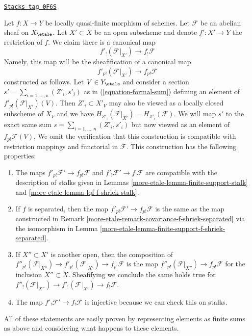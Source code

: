 \begin{remark}

\label{more-etale-remark-covariance-lqf-f-shriek}
\href{https://stacks.math.columbia.edu/tag/0F6S}{\texttt{Stacks tag 0F6S}}

Let $f : X \to Y$ be locally quasi-finite morphism of schemes. Let
$\mathcal{F}$ be an abelian sheaf on $X_\etale$.
Let $X' \subset X$ be an open subscheme and denote $f' : X' \to Y$
the restriction of $f$.
We claim there is a canonical map
$$
f'_!(\mathcal{F}|_{X'}) \longrightarrow f_!\mathcal{F}
$$
Namely, this map will be the sheafification of a canonical map
$$
f'_{p!}(\mathcal{F}|_{X'}) \to f_{p!}\mathcal{F}
$$
constructed as follows. Let $V \in Y_\etale$ and consider a section
$s' = \sum_{i = 1, \ldots, n} (Z'_i, s'_i)$ as in
(\ref{equation-formal-sum}) defining an element of
$f'_{p!}(\mathcal{F}|_{X'})(V)$.
Then $Z'_i \subset X'_V$ may also be viewed as a locally closed subscheme
of $X_V$ and we have $H_{Z'_i}(\mathcal{F}|_{X'}) = H_{Z'_i}(\mathcal{F})$.
We will map $s'$ to the exact same sum
$s = \sum_{i = 1, \ldots, n} (Z'_i, s'_i)$
but now viewed as an element of $f_{p!}\mathcal{F}(V)$.
We omit the verification that this construction is compatible with
restriction mappings and functorial in $\mathcal{F}$.
This construction has the following properties:
\begin{enumerate}
\item The maps $f'_{p!}\mathcal{F}' \to f_{p!}\mathcal{F}$ and
$f'_!\mathcal{F}' \to f_!\mathcal{F}$ are compatible with
the description of stalks given in Lemmas
\ref{more-etale-lemma-finite-support-stalk} and \ref{more-etale-lemma-lqf-f-shriek-stalk}.
\item If $f$ is separated, then the map
$f'_{p!}\mathcal{F}' \to f_{p!}\mathcal{F}$ is the same as the map
constructed in Remark \ref{more-etale-remark-covariance-f-shriek-separated}
via the isomorphism in Lemma \ref{more-etale-lemma-finite-support-f-shriek-separated}.
\item If $X'' \subset X'$ is another open, then the composition of
$f''_{p!}(\mathcal{F}|_{X''}) \to f'_{p!}(\mathcal{F}|_{X'}) \to
f_{p!}\mathcal{F}$ is the map
$f''_{p!}(\mathcal{F}|_{X''}) \to f_{p!}\mathcal{F}$ for the
inclusion $X'' \subset X$. Sheafifying we conclude
the same holds true for
$f''_!(\mathcal{F}|_{X''}) \to f'_!(\mathcal{F}|_{X'}) \to f_!\mathcal{F}$.
\item The map $f'_!\mathcal{F}' \to f_!\mathcal{F}$ is injective
because we can check this on stalks.
\end{enumerate}
All of these statements are easily proven by representing elements
as finite sums as above and considering what happens to these elements.
\end{remark}

